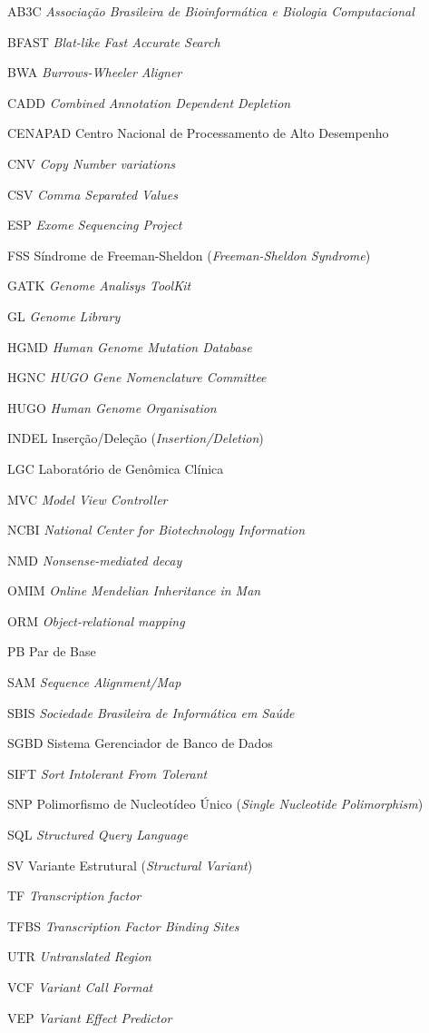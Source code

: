 \documentclass[
	12pt,				%
	openany,			%
	oneside,			%
	a4paper,			%
	english,			%
	brazil,				%
	]{abntex2}
\begin{document}
{}
\begin{siglas}
  \item[AB3C] \textit{Associação Brasileira de Bioinformática e Biologia Computacional}
  \item[BFAST] \textit{Blat-like Fast Accurate Search}
  \item[BWA] \textit{Burrows-Wheeler Aligner}
  \item[CADD] \textit{Combined Annotation Dependent Depletion}
  \item[CENAPAD] Centro Nacional de Processamento de Alto Desempenho
  \item[CNV] \textit{Copy Number variations}
  \item[CSV] \textit{Comma Separated Values}
  \item[ESP] \textit{Exome Sequencing Project}
  \item[FSS] Síndrome de Freeman-Sheldon (\textit{Freeman-Sheldon Syndrome})
  \item[GATK] \textit{Genome Analisys ToolKit}
  \item[GL] \textit{Genome Library}
  \item[HGMD] \textit{Human Genome Mutation Database}
  \item[HGNC] \textit{HUGO Gene Nomenclature Committee}
  \item[HUGO] \textit{Human Genome Organisation}
  \item[INDEL] Inserção/Deleção (\textit{Insertion/Deletion})
  \item[LGC] Laboratório de Genômica Clínica
  \item[MVC] \textit{Model View Controller}
  \item[NCBI] \textit{National Center for Biotechnology Information}
  \item[NMD] \textit{Nonsense-mediated decay}
  \item[OMIM] \textit{Online Mendelian Inheritance in Man}
  \item[ORM] \textit{Object-relational mapping}
  \item[PB] Par de Base
  \item[SAM] \textit{Sequence Alignment/Map}
  \item[SBIS] \textit{Sociedade Brasileira de Informática em Saúde}
  \item[SGBD] Sistema Gerenciador de Banco de Dados
  \item[SIFT] \textit{Sort Intolerant From Tolerant}
  \item[SNP] Polimorfismo de Nucleotídeo Único (\textit{Single Nucleotide Polimorphism})
  \item[SQL] \textit{Structured Query Language}
  \item[SV] Variante Estrutural (\textit{Structural Variant})
  \item[TF] \textit{Transcription factor}
  \item[TFBS] \textit{Transcription Factor Binding Sites}
  \item[UTR] \textit{Untranslated Region}
  \item[VCF] \textit{Variant Call Format}
  \item[VEP] \textit{Variant Effect Predictor}
  

\end{siglas}
\end{document}
